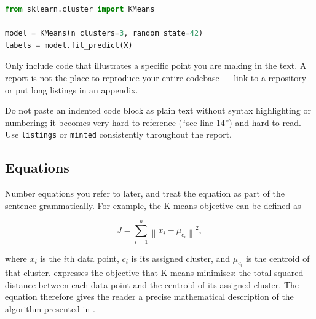\begin{lstlisting}[language=Python,
  caption={Clustering data points with K-means.},
  label={lst:kmeans}]
from sklearn.cluster import KMeans

model = KMeans(n_clusters=3, random_state=42)
labels = model.fit_predict(X)
\end{lstlisting}

\begin{tipbox}
  Only include code that illustrates a specific point you are making in
  the text. A report is not the place to reproduce your entire codebase
  --- link to a repository or put long listings in an appendix.
\end{tipbox}

\begin{pitfallbox}
  Do not paste an indented code block as plain text without syntax
  highlighting or numbering; it becomes very hard to reference (``see line
  14'') and hard to read. Use \texttt{listings} or \texttt{minted}
  consistently throughout the report.
\end{pitfallbox}

\subsection{Equations}
Number equations you refer to later, and treat the equation as part of
the sentence grammatically. For example, the K-means objective can be
defined as

\begin{equation}
  \label{eq:kmeans}
  J =
  \sum_{i=1}^{n}
  \left\lVert x_i - \mu_{c_i} \right\rVert^2,
\end{equation}

where $x_i$ is the $i$th data point, $c_i$ is its assigned cluster, and
$\mu_{c_i}$ is the centroid of that cluster.  expresses
the objective that K-means minimises: the total squared distance between
each data point and the centroid of its assigned cluster. The equation
therefore gives the reader a precise mathematical description of the
algorithm presented in .

